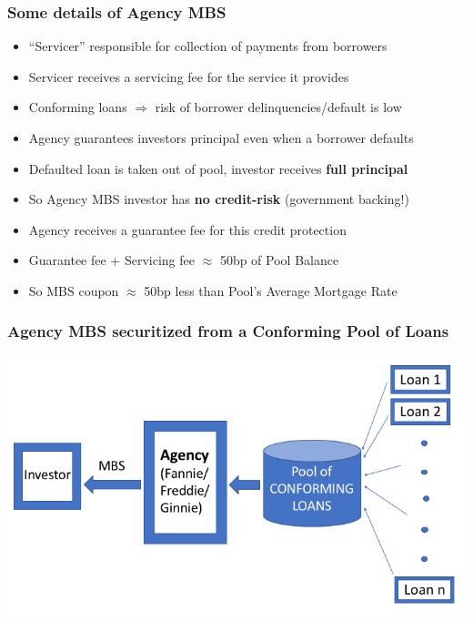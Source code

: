 \documentclass{beamer}
\begin{document}
\begin{frame}
\frametitle{Some details of Agency MBS}
\begin{itemize}
\item ``Servicer'' responsible for collection of payments from borrowers
\item Servicer receives a servicing fee for the service it provides
\item Conforming loans $\Rightarrow$ risk of borrower delinquencies/default is low
\item Agency guarantees investors principal even when a borrower defaults
\item Defaulted loan is taken out of pool, investor receives {\bf full principal}
\item So Agency MBS investor has {\bf no credit-risk} (government backing!)
\item Agency receives a guarantee fee for this credit protection
\item Guarantee fee + Servicing fee $\approx$ 50bp of Pool Balance
\item So MBS coupon $\approx$ 50bp less than Pool's Average Mortgage Rate 
\end{itemize}
\end{frame}


\begin{frame}
\frametitle{Agency MBS securitized from a Conforming Pool of Loans}
\includegraphics[scale=0.35]{securitization_flow.png}
\end{frame}

\end{document}

